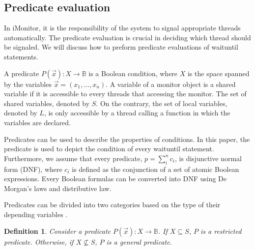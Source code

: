 \documentclass[preprint]{sigplanconf}
\newtheorem{definition}{Definition}
\begin{document}
\subsection{Predicate evaluation}
In iMonitor, it is the responsibility of the system to signal appropriate 
threads automatically. The predicate evaluation is crucial in deciding which
thread should be signaled. We will discuss how to preform predicate evaluations
of waituntil statements. 

A predicate $P(\vec{x}): X \rightarrow \mathbb{B}$ is a Boolean condition, 
where $X$ is the space spanned by the variables $\vec{x}=(x_1, \dots, x_n)$. 
A variable of a monitor object is a shared variable if it is accessible to every 
threads that accessing the monitor. The set of shared variables, denoted by 
$S$. On the contrary, the set of local variables, denoted by $L$, is only 
accessible by a thread calling a function in which the variables are declared. 

Predicates can be used to describe the properties of conditions. In this paper,
the predicate is used to depict the condition of every waituntil statement. 
Furthermore, we assume that every predicate, $p = \sum_i^nc_i$, is disjunctive 
normal form (DNF), where $c_i$ is defined as the conjunction of a set
of atomic Boolean expressions. Every Boolean formulas can be converted into DNF 
using De Morgan's laws and distributive law. 

Predicates can be divided into two categories based on the type of their 
depending variables \cite{bh05}.
\begin{definition}
    Consider a predicate $P(\vec{x}): X \rightarrow \mathbb{B}$. If $X 
    \subseteq S$, $P$ 
    is a restricted predicate. Otherwise, if $X \not\subseteq S$, $P$ 
    is a general predicate. 
\end{definition}
\end{document}
